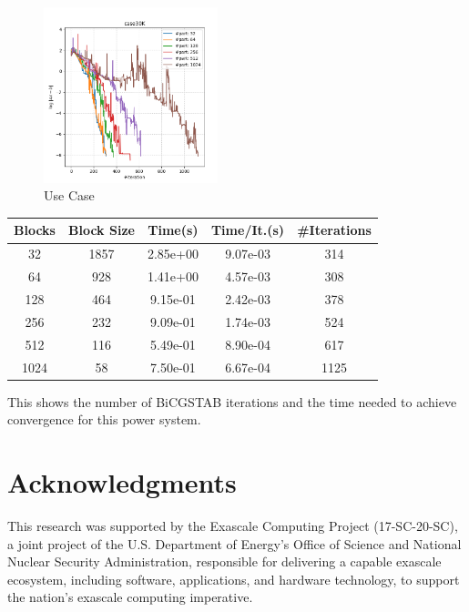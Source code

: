 \documentclass{juliacon}
\begin{document}
\begin{figure}
    \includegraphics[width=0.45\textwidth]{figures/usecase.png}
    \caption{Use Case}
    \label{fig:usecase}
\end{figure}

\begin{table}[t]
    \begin{tabular}{ccccc}
    Blocks & Block Size & Time(s) &  Time/It.(s) & \#Iterations \\
    \hline
    32 &   1857 &       2.85e+00 &  9.07e-03 &  314 \\
    64 &   928  &       1.41e+00 &  4.57e-03 &  308 \\
    128 &   464  &       9.15e-01 &  2.42e-03 &  378 \\
    256 &   232  &       9.09e-01 &  1.74e-03 &  524 \\
    512 &   116  &       5.49e-01 &  8.90e-04 &  617 \\
    1024 &   58   &       7.50e-01 &  6.67e-04 & 1125 \\
    \end{tabular}
\end{table}


This shows the number of BiCGSTAB iterations and the time needed to achieve convergence for this power system.

\section{Acknowledgments}

This research was supported by the Exascale Computing Project (17-SC-20-SC), a joint project of the U.S. Department of Energy’s Office of Science and National Nuclear Security Administration, responsible for delivering a capable exascale ecosystem, including software, applications, and hardware technology, to support the nation’s exascale computing imperative.
\end{document}

